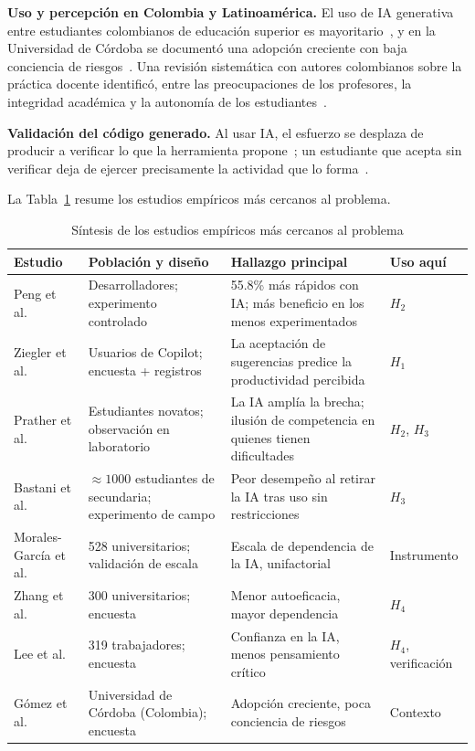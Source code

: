 \documentclass[12pt,letterpaper]{article}
\numberwithin{table}{section}
\numberwithin{figure}{section}
\begin{document}
\textbf{Uso y percepción en Colombia y Latinoamérica.} El uso de IA generativa entre estudiantes colombianos de educación superior es mayoritario~\cite{planeta2024inteligencia}, y en la Universidad de Córdoba se documentó una adopción creciente con baja conciencia de riesgos~\cite{gomez2025estudio}. Una revisión sistemática con autores colombianos sobre la práctica docente identificó, entre las preocupaciones de los profesores, la integridad académica y la autonomía de los estudiantes~\cite{martinezgarces2026inteligencia}.

\textbf{Validación del código generado.} Al usar IA, el esfuerzo se desplaza de producir a verificar lo que la herramienta propone~\cite{lee2025impact}; un estudiante que acepta sin verificar deja de ejercer precisamente la actividad que lo forma~\cite{becker2023programming}.

La Tabla~\ref{tab:sintesis_estudios} resume los estudios empíricos más cercanos al problema.

\begin{table}[ht]
\centering
\caption{Síntesis de los estudios empíricos más cercanos al problema}
\label{tab:sintesis_estudios}
\footnotesize
\begin{tabular}{@{}p{2.3cm}p{3.0cm}p{5.0cm}p{1.9cm}@{}}
\toprule
\textbf{Estudio} & \textbf{Población y diseño} & \textbf{Hallazgo principal} & \textbf{Uso aquí} \\
\midrule
Peng et al.~\cite{peng2023impact} & Desarrolladores; experimento controlado & 55.8\% más rápidos con IA; más beneficio en los menos experimentados & $H_2$ \\
Ziegler et al.~\cite{ziegler2024measuring} & Usuarios de Copilot; encuesta + registros & La aceptación de sugerencias predice la productividad percibida & $H_1$ \\
Prather et al.~\cite{prather2024widening} & Estudiantes novatos; observación en laboratorio & La IA amplía la brecha; ilusión de competencia en quienes tienen dificultades & $H_2$, $H_3$ \\
Bastani et al.~\cite{bastani2025generative} & $\approx 1000$ estudiantes de secundaria; experimento de campo & Peor desempeño al retirar la IA tras uso sin restricciones & $H_3$ \\
Morales-García et al.~\cite{moralesgarcia2024development} & 528 universitarios; validación de escala & Escala de dependencia de la IA, unifactorial & Instrumento \\
Zhang et al.~\cite{zhang2024dependency} & 300 universitarios; encuesta & Menor autoeficacia, mayor dependencia & $H_4$ \\
Lee et al.~\cite{lee2025impact} & 319 trabajadores; encuesta & Confianza en la IA, menos pensamiento crítico & $H_4$, verificación \\
Gómez et al.~\cite{gomez2025estudio} & Universidad de Córdoba (Colombia); encuesta & Adopción creciente, poca conciencia de riesgos & Contexto \\
\bottomrule
\end{tabular}
\end{table}
\end{document}
